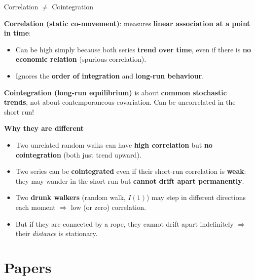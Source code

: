 \documentclass{beamer}
\begin{document}
\begin{frame}{Correlation $\neq$ Cointegration}
\footnotesize

\textbf{Correlation (static co-movement)}: measures \textbf{linear association at a point in time}:
  \begin{itemize}
  \item Can be high simply because both series \textbf{trend over time}, even if
        there is \textbf{no economic relation} (spurious correlation).
  \item Ignores the \textbf{order of integration} and \textbf{long-run behaviour}.
\end{itemize}

\medskip
\textbf{Cointegration (long-run equilibrium)} is about \textbf{common stochastic trends}, not about
        contemporaneous covariation. Can be uncorrelated in the short run!

\medskip
\textbf{Why they are different}
\begin{itemize}
  \item Two unrelated random walks can have \textbf{high correlation} but
        \textbf{no cointegration} (both just trend upward).
  \item Two series can be \textbf{cointegrated} even if their short-run
        correlation is \textbf{weak}: they may wander in the short run but
        \textbf{cannot drift apart permanently}.
\end{itemize}

\medskip
\begin{itemize}
    \item Two \textbf{drunk walkers} (random walk, $I(1)$) may step in different directions each moment $\Rightarrow$ low (or zero) correlation. 
    \item But if they are connected by a rope, they cannot drift apart indefinitely $\Rightarrow$ their \emph{distance} is stationary.
\end{itemize}

\end{frame}




\section{Papers}
\end{document}
